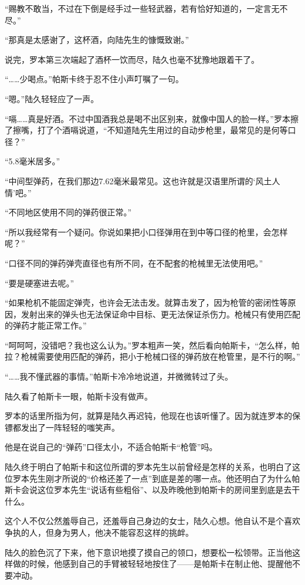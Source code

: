 “赐教不敢当，不过在下倒是经手过一些轻武器，若有恰好知道的，一定言无不尽。”

“那真是太感谢了，这杯酒，向陆先生的慷慨致谢。”

说完，罗本第三次端起了酒杯一饮而尽，陆久也毫不犹豫地跟着干了。

“……少喝点。”帕斯卡终于忍不住小声叮嘱了一句。

“嗯。”陆久轻轻应了一声。

“嗝……真是好酒。不过中国酒我总是喝不出区别来，就像中国人的脸一样。”罗本擦了擦嘴，打了个酒嗝说道，“不知道陆先生用过的自动步枪里，最常见的是何等口径？”

“5.8毫米居多。”

“中间型弹药，在我们那边7.62毫米最常见。这也许就是汉语里所谓的‘风土人情’吧。”

“不同地区使用不同的弹药很正常。”

“所以我经常有一个疑问。你说如果把小口径弹用在到中等口径的枪里，会怎样呢？”

“口径不同的弹药弹壳直径也有所不同，在不配套的枪械里无法使用吧。”

“要是硬塞进去呢。”

“如果枪机不能固定弹壳，也许会无法击发。就算击发了，因为枪管的密闭性等原因，发射出来的弹头也无法保证命中目标、更无法保证杀伤力。枪械只有使用匹配的弹药才能正常工作。”

“呵呵呵，没错吧？我也这么认为。”罗本粗声一笑，然后看向帕斯卡，“怎么样，帕拉？枪械需要使用匹配的弹药，把小于枪械口径的弹药放在枪管里，是不行的啊。”

“……我不懂武器的事情。”帕斯卡冷冷地说道，并微微转过了头。

陆久看了帕斯卡一眼，帕斯卡没有做声。

罗本的话里所指为何，就算是陆久再迟钝，他现在也该听懂了。因为就连罗本的保镖都发出了一阵轻轻的嗤笑声。

他是在说自己的“弹药”口径太小，不适合帕斯卡“枪管”吗。

陆久终于明白了帕斯卡和这位所谓的罗本先生以前曾经是怎样的关系，也明白了这位罗本先生刚才所说的“价格还差了一点”到底是差的哪一点。他还明白了为什么帕斯卡会说这位罗本先生“说话有些粗俗”、以及昨晚他到帕斯卡的房间里到底是去干什么。

这个人不仅公然羞辱自己，还羞辱自己身边的女士，陆久心想。他自认不是个喜欢争执的人，但身为男人，他决不能容忍这样的挑衅。

陆久的脸色沉了下来，他下意识地摸了摸自己的领口，想要松一松领带。正当他这样做的时候，他感到自己的手臂被轻轻地按住了——是帕斯卡在制止他、提醒他不要冲动。


